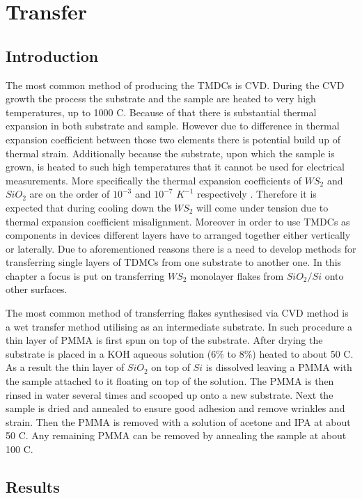 \section{Transfer}
	\subsection{Introduction}
		The most common method of producing the TMDCs is CVD. During the CVD growth the process the substrate and the sample are heated to very high temperatures, up to 1000 {\degree}C. Because of that there is substantial thermal expansion in both substrate and sample. However due to difference in thermal expansion coefficient between those two elements there is potential build up of thermal strain. Additionally because the substrate, upon which the sample is grown, is heated to such high temperatures that it cannot be used for electrical measurements. More specifically the thermal expansion coefficients of $WS_2$ and $SiO_2$ are on the order of $10^{-3}$ and $10^{-7}$ $K^{-1}$ respectively \cite{Hu2018}\cite{Tada2000}. Therefore it is expected that during cooling down the $WS_2$ will come under tension due to thermal expansion coefficient misalignment. Moreover in order to use TMDCs as components in devices different layers have to arranged together either vertically or laterally. Due to aforementioned reasons there is a need to develop methods for transferring single layers of TDMCs from one substrate to another one. In this chapter a focus is put on transferring $WS_2$ monolayer flakes from $SiO_2/Si$ onto other surfaces.
		
		The most common method of transferring flakes synthesised via CVD method is a wet transfer method utilising as an intermediate substrate. In such procedure a thin layer of PMMA is first spun on top of the substrate. After drying the substrate is placed in a KOH aqueous solution (6\% to 8\%) heated to about 50 {\degree}C. As a result the thin layer of $SiO_2$ on top of $Si$ is dissolved leaving a PMMA with the sample attached to it floating on top of the solution. The PMMA is then rinsed in water several times and scooped up onto a new substrate. Next the sample is dried and annealed to ensure good adhesion and remove wrinkles and strain. Then the PMMA is removed with a solution of acetone and IPA at about 50 {\degree}C. Any remaining PMMA can be removed by annealing the sample at about 100 {\degree}C.  
		
	\subsection{Results}
	
